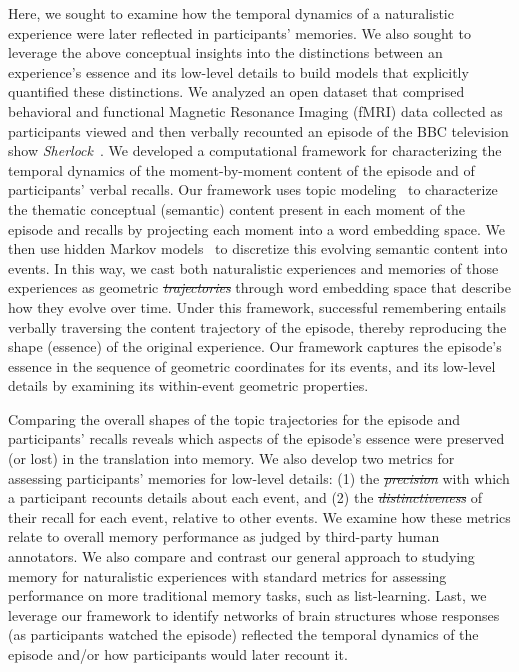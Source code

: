 \documentclass[10pt]{article}
\renewcommand{\includegraphics}[2][]{} %
\providecommand{\DIFaddtex}[1]{{\protect\color{blue}\uwave{#1}}} %
\providecommand{\DIFdeltex}[1]{{\protect\color{red}\sout{#1}}}                      %
\providecommand{\DIFaddbegin}{} %
\providecommand{\DIFaddend}{} %
\providecommand{\DIFdelbegin}{} %
\providecommand{\DIFdelend}{} %
\providecommand{\DIFadd}[1]{\texorpdfstring{\DIFaddtex{#1}}{#1}} %
\providecommand{\DIFdel}[1]{\texorpdfstring{\DIFdeltex{#1}}{}} %
\newcommand{\DIFscaledelfig}{0.5}
\newlength{\DIFdelgraphicswidth} %
\newlength{\DIFdelgraphicsheight} %
\newcommand{\DIFaddincludegraphics}[2][]{{\color{blue}\fbox{\DIFOincludegraphics[#1]{#2}}}} %
\newcommand{\DIFdelincludegraphics}[2][]{%
\sbox{\DIFdelgraphicsbox}{\DIFOincludegraphics[#1]{#2}}%
\settoboxwidth{\DIFdelgraphicswidth}{\DIFdelgraphicsbox} %
\settoboxtotalheight{\DIFdelgraphicsheight}{\DIFdelgraphicsbox} %
\scalebox{\DIFscaledelfig}{%
\parbox[b]{\DIFdelgraphicswidth}{\usebox{\DIFdelgraphicsbox}\\[-\baselineskip] \rule{\DIFdelgraphicswidth}{0em}}\llap{\resizebox{\DIFdelgraphicswidth}{\DIFdelgraphicsheight}{%
\setlength{\unitlength}{\DIFdelgraphicswidth}%
\begin{picture}(1,1)%
\thicklines\linethickness{2pt} %
{\color[rgb]{1,0,0}\put(0,0){\framebox(1,1){}}}%
{\color[rgb]{1,0,0}\put(0,0){\line( 1,1){1}}}%
{\color[rgb]{1,0,0}\put(0,1){\line(1,-1){1}}}%
\end{picture}%
}\hspace*{3pt}}} %
} %
\DeclareRobustCommand{\DIFaddbegin}{\DIFOaddbegin \let\includegraphics\DIFaddincludegraphics} %
\DeclareRobustCommand{\DIFaddend}{\DIFOaddend \let\includegraphics\DIFOincludegraphics} %
\DeclareRobustCommand{\DIFdelbegin}{\DIFOdelbegin \let\includegraphics\DIFdelincludegraphics} %
\DeclareRobustCommand{\DIFdelend}{\DIFOaddend \let\includegraphics\DIFOincludegraphics} %
\begin{document}
Here, we sought to examine how the temporal dynamics of a naturalistic experience were later reflected in participants' memories.  We also sought to leverage the above conceptual insights into the distinctions between an experience's essence and its low-level details to build models that explicitly quantified these distinctions.  We analyzed an open dataset that comprised behavioral and functional Magnetic Resonance Imaging (fMRI) data collected as participants viewed and then verbally recounted an episode of the BBC television show \textit{Sherlock}~\citep{ChenEtal17}.  We developed a computational framework for characterizing the temporal dynamics of the moment-by-moment content of the episode and of participants' verbal recalls.  Our framework uses topic modeling~\citep{BleiEtal03} to characterize the thematic conceptual (semantic) content present in each moment of the episode and recalls by projecting each moment into a word embedding space.  We then use hidden Markov models~\citep{Rabi89, BaldEtal17} to discretize this evolving semantic content into events.  In this way, we cast both naturalistic experiences and memories of those experiences as geometric \DIFdelbegin \textit{\DIFdel{trajectories}} %
\DIFdelend \DIFaddbegin \DIFadd{``trajectories'' }\DIFaddend through word embedding space that describe how they evolve over time. Under this framework, successful remembering entails verbally traversing the content trajectory of the episode, thereby reproducing the shape (essence) of the original experience.  Our framework captures the episode's essence in the sequence of geometric coordinates for its events, and its low-level details by examining its within-event geometric properties.

Comparing the overall shapes of the topic trajectories for the episode and participants' recalls reveals which aspects of the episode's essence were preserved (or lost) in the translation into memory.  We also develop two metrics for assessing participants' memories for low-level details: (1) the \DIFdelbegin \textit{\DIFdel{precision}} %
\DIFdelend \DIFaddbegin \DIFadd{``precision'' }\DIFaddend with which a participant recounts details about each event, and (2) the \DIFdelbegin \textit{\DIFdel{distinctiveness}} %
\DIFdelend \DIFaddbegin \DIFadd{``distinctiveness'' }\DIFaddend of their recall for each event, relative to other events.  We examine how these metrics relate to overall memory performance as judged by third-party human annotators.  We also compare and contrast our general approach to studying memory for naturalistic experiences with standard metrics for assessing performance on more traditional memory tasks, such as list-learning.  Last, we leverage our framework to identify networks of brain structures whose responses (as participants watched the episode) reflected the temporal dynamics of the episode and/or how participants would later recount it.
\end{document}
